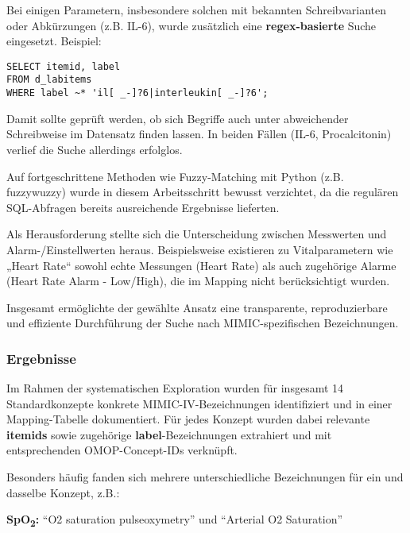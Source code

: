 \documentclass[12pt]{article}
\begin{document}
Bei einigen Parametern, insbesondere solchen mit bekannten Schreibvarianten oder Abkürzungen (z.B. IL-6), wurde zusätzlich eine \textbf{regex-basierte} Suche eingesetzt. Beispiel:
\begin{lstlisting}
SELECT itemid, label
FROM d_labitems
WHERE label ~* 'il[ _-]?6|interleukin[ _-]?6';
\end{lstlisting}

Damit sollte geprüft werden, ob sich Begriffe auch unter abweichender Schreibweise im Datensatz finden lassen. In beiden Fällen (IL-6, Procalcitonin) verlief die Suche allerdings erfolglos.

Auf fortgeschrittene Methoden wie Fuzzy-Matching mit Python (z.B. fuzzywuzzy) wurde in diesem Arbeitsschritt bewusst verzichtet, da die regulären SQL-Abfragen bereits ausreichende Ergebnisse lieferten.

Als Herausforderung stellte sich die Unterscheidung zwischen Messwerten und Alarm-/Einstellwerten heraus. Beispielsweise existieren zu Vitalparametern wie „Heart Rate“ sowohl echte Messungen (Heart Rate) als auch zugehörige Alarme (Heart Rate Alarm - Low/High), die im Mapping nicht berücksichtigt wurden.

Insgesamt ermöglichte der gewählte Ansatz eine transparente, reproduzierbare und effiziente Durchführung der Suche nach MIMIC-spezifischen Bezeichnungen.




\subsubsection{Ergebnisse}

Im Rahmen der systematischen Exploration wurden für insgesamt 14 Standardkonzepte konkrete MIMIC-IV-Bezeichnungen identifiziert und in einer Mapping-Tabelle dokumentiert. Für jedes Konzept wurden dabei relevante \textbf{itemids} sowie zugehörige \textbf{label}-Bezeichnungen extrahiert und mit entsprechenden OMOP-Concept-IDs verknüpft.

Besonders häufig fanden sich mehrere unterschiedliche Bezeichnungen für ein und dasselbe Konzept, z.B.: \vspace{2mm}

\textbf{SpO\textsubscript{2}:} ``O2 saturation pulseoxymetry'' und ``Arterial O2 Saturation''
\end{document}
